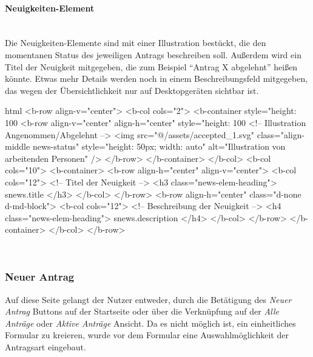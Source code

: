 \paragraph{Neuigkeiten-Element}
~\\
Die Neuigkeiten-Elemente sind mit einer Illustration bestückt, die den momentanen Status des jeweiligen Antrags beschreiben soll. Außerdem wird ein Titel der Neuigkeit mitgegeben, die zum Beispiel \enquote{Antrag X abgelehnt} heißen könnte. Etwas mehr Details werden noch in einem Beschreibungsfeld mitgegeben, das wegen der Übersichtlichkeit nur auf Desktopgeräten sichtbar ist.
\begin{code}{html}
	<b-row align-v="center">
	<b-col cols="2">
	  <b-container style="height: 100%
		<b-row align-v="center" align-h="center" style="height: 100%
		  <!-- Illustration Angenommen/Abgelehnt -->
		  <img
			src="@/assets/accepted_1.svg"
			class="align-middle news-status"
			style="height: 50px; width: auto"
			alt="Illustration von arbeitenden Personen"
		  />
		</b-row>
	  </b-container>
	</b-col>
	<b-col cols="10">
	  <b-container>
		<b-row align-h="center" align-v="center">
		  <b-col cols="12">
			<!-- Titel der Neuigkeit -->
			<h3 class="news-elem-heading">{{ snews.title }}</h3>
		  </b-col>
		</b-row>
		<b-row align-h="center" class="d-none d-md-block">
		  <b-col cols="12">
			<!-- Beschreibung der Neuigkeit -->
			<h4 class="news-elem-heading">{{ snews.description }}</h4>
		  </b-col>
		</b-row>
	  </b-container>
	</b-col>
  </b-row>	
\end{code}
	\label{list:htmlnews} ~\\
\newpage
\subsubsection{Neuer Antrag}
\label{chapter:implementierung-frontend-komponenten-neu}
Auf diese Seite gelangt der Nutzer entweder, durch die Betätigung des \textit{Neuer Antrag} Buttons auf der Startseite oder über die Verknüpfung auf der \textit{Alle Anträge} oder \textit{Aktive Anträge} Ansicht. Da es nicht möglich ist, ein einheitliches Formular zu kreieren, wurde vor dem Formular eine Auswahlmöglichkeit der Antragsart eingebaut.
